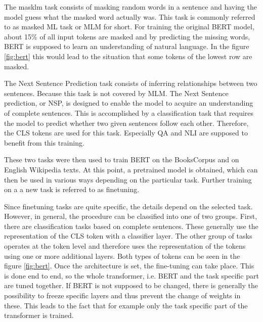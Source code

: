 The masklm task consists of masking random words in a sentence and having the model guess what the masked word actually was. This task is commonly referred to as masked ML task or MLM for short. For training the original BERT model, about 15\% of all input tokens are masked and by predicting the missing words, BERT is supposed to learn an understanding of natural language. In the figure \ref{fig:bert} this would lead to the situation that some tokens of the lowest row are masked. \cite{Devlin2018}

The Next Sentence Prediction task consists of inferring relationships between two sentences. Because this task is not covered by MLM. The Next Sentence
prediction, or NSP, is designed to enable the model to acquire an understanding of complete sentences. This is accomplished by a classification task that requires the model to predict whether two given sentences follow each other. Therefore, the CLS tokens are used for this task. Especially QA and NLI are supposed to benefit from this training. \cite{Devlin2018}

These two tasks were then used to train BERT on the BooksCorpus and on English Wikipedia texts. At this point, a pretrained model is obtained, which can then be used in various ways depending on the particular task. Further training on a a new task is referred to as finetuning. \cite{Devlin2018}

Since finetuning tasks are quite specific, the details depend on the selected task. However, in general, the procedure can be classified into one of two groups. First, there are classification tasks based on complete sentences. These generally use the representation of the CLS token with a classifier layer. The other group of tasks operates at the token level and therefore uses the representation of the tokens using one or more additional layers. Both types of tokens can be seen in the figure \ref{fig:bert}.  Once the architecture is set, the fine-tuning can take place. This is done end to end, so the whole transformer, i.e. BERT and the task specific part are tuned together. If BERT is not supposed to be changed, there is generally the possibility to freeze specific layers and thus prevent the change of weights in these. This leads to the fact that for example only the task specific part of the transformer is trained. 


